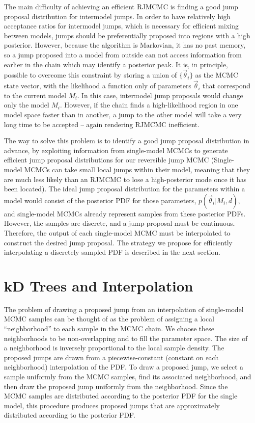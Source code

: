 \documentclass{rsos}
\newcommand{\vtheta}{\vec{\theta}}
\begin{document}
The main difficulty of achieving an efficient RJMCMC is finding a good
jump proposal distribution for intermodel jumps.  In order to have
relatively high acceptance ratios for intermodel jumps, which is
necessary for efficient mixing between models, jumps should be
preferentially proposed into regions with a high posterior.  However,
because the algorithm is Markovian, it has no past memory, so a jump
proposed into a model from outside can not access information from
earlier in the chain which may identify a posterior peak.  It is, in principle, possible to overcome this constraint by storing a union of $\{\vtheta_i\}$ as the MCMC state vector, with the likelihood a function only of parameters $\vtheta_i$ that correspond to the current model $M_i$.  In this case, intermodel jump proposals would change only the model $M_i$.  However, if the chain finds a high-likelihood region in one model space faster than in another, a jump to the other model will take a very long time to be accepted -- again rendering RJMCMC inefficient.

The way to solve this problem is to identify a good jump proposal
distribution in advance, by exploiting information from single-model
MCMCs to generate efficient jump proposal distributions for our
reversible jump MCMC (Single-model MCMCs can take small local jumps
within their model, meaning that they are much less likely than an
RJMCMC to lose a high-posterior mode once it has been located).  The
ideal jump proposal distribution for the parameters within a model
would consist of the posterior PDF for those parameters,
$p(\vtheta_i|M_i,d)$, and single-model MCMCs already represent samples
from these posterior PDFs.  However, the samples are discrete, and a
jump proposal must be continuous.  Therefore, the output of each
single-model MCMC must be interpolated to construct the desired jump
proposal.  The strategy we propose for efficiently interpolating
a discretely sampled PDF is described in the next section.

\section{kD Trees and Interpolation}
\label{sec:kDTree}

The problem of drawing a proposed jump from an interpolation of
single-model MCMC samples can be thought of as the problem of assigning
a local ``neighborhood'' to each sample in the MCMC chain.
We choose these neighborhoods to be non-overlapping and to fill the parameter
space.  The size of a
neighborhood is inversely proportional to the local sample density.
The proposed jumps are drawn from a piecewise-constant (constant on
each neighborhood) interpolation of the PDF.  
To draw a proposed jump, we select a sample uniformly from the
MCMC samples, find its associated neighborhood, and then draw the
proposed jump uniformly from the neighborhood.  Since the MCMC samples
are distributed according to the posterior PDF for the single model,
this procedure produces proposed jumps that are approximately
distributed according to the posterior PDF.  
\end{document}
